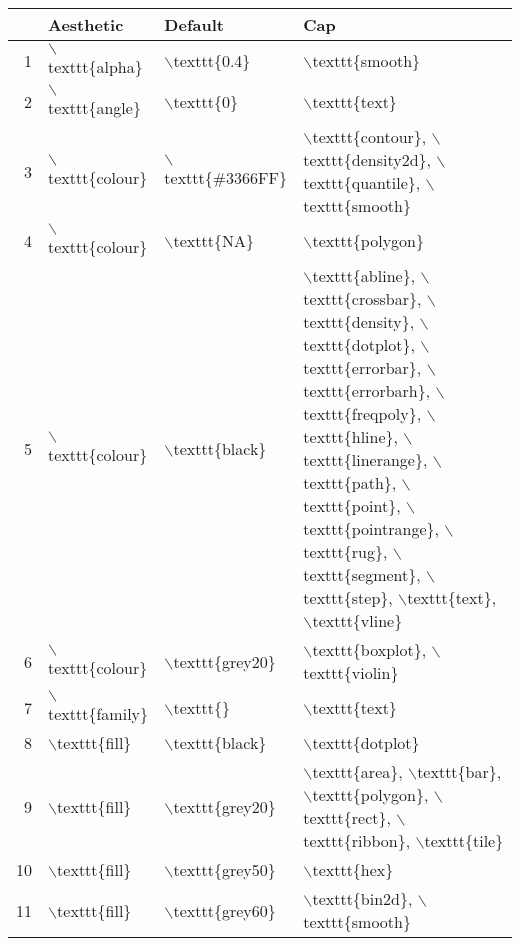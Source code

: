 \begin{table}[ht]
\centering
\begin{tabular}{rlll}
  \hline
 & Aesthetic & Default & Cap \\ 
  \hline
1 & $\backslash$texttt\{alpha\} & $\backslash$texttt\{0.4\} & $\backslash$texttt\{smooth\} \\ 
  2 & $\backslash$texttt\{angle\} & $\backslash$texttt\{0\} & $\backslash$texttt\{text\} \\ 
  3 & $\backslash$texttt\{colour\} & $\backslash$texttt\{\#3366FF\} & $\backslash$texttt\{contour\}, $\backslash$texttt\{density2d\}, $\backslash$texttt\{quantile\}, $\backslash$texttt\{smooth\} \\ 
  4 & $\backslash$texttt\{colour\} & $\backslash$texttt\{NA\} & $\backslash$texttt\{polygon\} \\ 
  5 & $\backslash$texttt\{colour\} & $\backslash$texttt\{black\} & $\backslash$texttt\{abline\}, $\backslash$texttt\{crossbar\}, $\backslash$texttt\{density\}, $\backslash$texttt\{dotplot\}, $\backslash$texttt\{errorbar\}, $\backslash$texttt\{errorbarh\}, $\backslash$texttt\{freqpoly\}, $\backslash$texttt\{hline\}, $\backslash$texttt\{linerange\}, $\backslash$texttt\{path\}, $\backslash$texttt\{point\}, $\backslash$texttt\{pointrange\}, $\backslash$texttt\{rug\}, $\backslash$texttt\{segment\}, $\backslash$texttt\{step\}, $\backslash$texttt\{text\}, $\backslash$texttt\{vline\} \\ 
  6 & $\backslash$texttt\{colour\} & $\backslash$texttt\{grey20\} & $\backslash$texttt\{boxplot\}, $\backslash$texttt\{violin\} \\ 
  7 & $\backslash$texttt\{family\} & $\backslash$texttt\{\} & $\backslash$texttt\{text\} \\ 
  8 & $\backslash$texttt\{fill\} & $\backslash$texttt\{black\} & $\backslash$texttt\{dotplot\} \\ 
  9 & $\backslash$texttt\{fill\} & $\backslash$texttt\{grey20\} & $\backslash$texttt\{area\}, $\backslash$texttt\{bar\}, $\backslash$texttt\{polygon\}, $\backslash$texttt\{rect\}, $\backslash$texttt\{ribbon\}, $\backslash$texttt\{tile\} \\ 
  10 & $\backslash$texttt\{fill\} & $\backslash$texttt\{grey50\} & $\backslash$texttt\{hex\} \\ 
  11 & $\backslash$texttt\{fill\} & $\backslash$texttt\{grey60\} & $\backslash$texttt\{bin2d\}, $\backslash$texttt\{smooth\} \\ 

\end{tabular}
\end{table}
